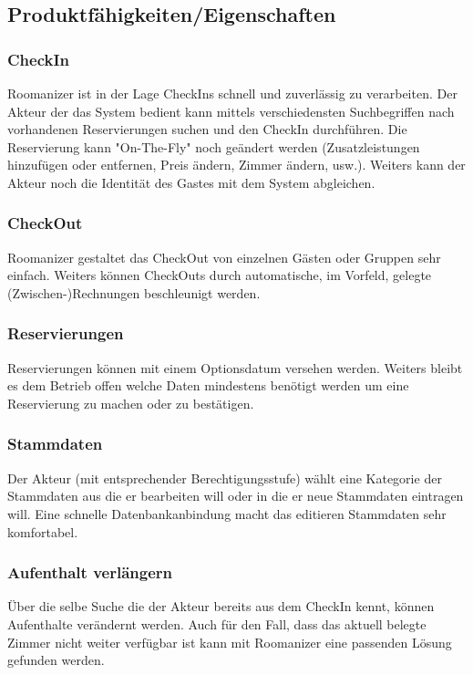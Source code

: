 \documentclass[10pt,a4paper,titlepage]{article}
\begin{document}
\subsection{Produktfähigkeiten/Eigenschaften}
\subsubsection{CheckIn }
Roomanizer ist in der Lage CheckIns schnell und zuverlässig zu verarbeiten. Der Akteur der das System bedient kann mittels  verschiedensten Suchbegriffen nach vorhandenen Reservierungen suchen und den CheckIn durchführen. Die Reservierung kann "On-The-Fly" noch geändert werden (Zusatzleistungen hinzufügen oder entfernen, Preis ändern, Zimmer ändern, usw.). Weiters kann der Akteur noch die Identität des Gastes mit dem System abgleichen.

\subsubsection{CheckOut }
Roomanizer gestaltet das CheckOut von einzelnen Gästen oder Gruppen sehr einfach. Weiters können CheckOuts durch automatische, im Vorfeld, gelegte (Zwischen-)Rechnungen beschleunigt werden.

\subsubsection{Reservierungen}
Reservierungen können mit einem Optionsdatum versehen werden. Weiters bleibt es dem Betrieb offen welche Daten mindestens benötigt werden um eine Reservierung zu machen oder zu bestätigen.

\subsubsection{Stammdaten }
Der Akteur (mit entsprechender Berechtigungsstufe) wählt eine Kategorie der Stammdaten aus die er bearbeiten will oder in die er neue Stammdaten eintragen will. Eine schnelle Datenbankanbindung macht das editieren Stammdaten sehr komfortabel.

\subsubsection{Aufenthalt verlängern }
Über die selbe Suche die der Akteur bereits aus dem CheckIn kennt, können Aufenthalte verändernt werden. Auch für den Fall, dass das aktuell belegte Zimmer nicht weiter verfügbar ist kann mit Roomanizer eine passenden Lösung gefunden werden. 
\end{document}
